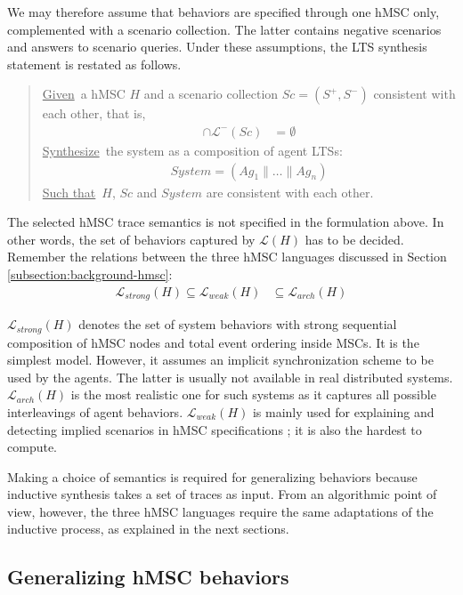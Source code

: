 We may therefore assume that behaviors are specified through one hMSC only, complemented with a scenario collection. The latter contains negative scenarios and answers to scenario queries. Under these assumptions, the LTS synthesis statement is restated as follows.

\begin{quote}
\underline{Given}~a hMSC $H$ and a scenario collection $Sc = (S^+,S^-)$ consistent with each other, that is,
\begin{align*}
[\mathcal{L}^+(Sc) \cup \mathcal{L}(H)] \cap \mathcal{L}^-(Sc) &= \emptyset
\end{align*}
\underline{Synthesize}~the system as a composition of agent LTSs:
\begin{align*}
System = (Ag_1 \parallel \ldots \parallel Ag_n)
\end{align*}
\underline{Such that}~$H$, $Sc$ and $System$ are consistent with each other.
\end{quote}

The selected hMSC trace semantics is not specified in the formulation above. In other words, the set of behaviors captured by $\mathcal{L}(H)$ has to be decided. Remember the relations between the three hMSC languages discussed in Section \ref{subsection:background-hmsc}: 
\begin{align}
\mathcal{L}_{strong}(H) \subseteq \mathcal{L}_{weak}(H) &\subseteq \mathcal{L}_{arch}(H)
\end{align}

$\mathcal{L}_{strong}(H)$ denotes the set of system behaviors with strong sequential composition of hMSC nodes and total event ordering inside MSCs. It is the simplest model. However, it assumes an implicit synchronization scheme to be used by the agents. The latter is usually not available in real distributed systems. $\mathcal{L}_{arch}(H)$ is the most realistic one for such systems as it captures all possible interleavings of agent behaviors. $\mathcal{L}_{weak}(H)$ is mainly used for explaining and detecting implied scenarios in hMSC specifications \cite{Uchitel:2003}; it is also the hardest to compute.

Making a choice of semantics is required for generalizing behaviors because inductive synthesis takes a set of traces as input. From an algorithmic point of view, however, the three hMSC languages require the same adaptations of the inductive process, as explained in the next sections.

\subsection{Generalizing hMSC behaviors\label{subsection:hmsc-induction-algo-adaptation}}

